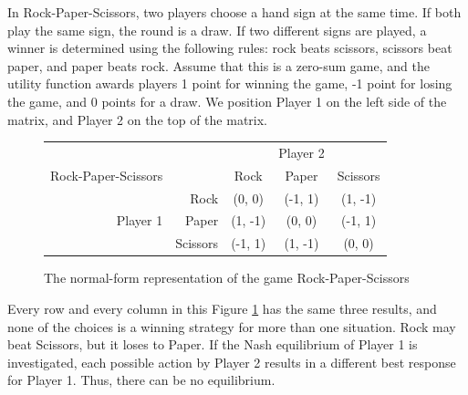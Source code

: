 \begin{exmp}
  In Rock-Paper-Scissors, two players choose a hand sign at the same time. If both play the same sign, the round is a draw. If two different signs are played, a winner is determined using the following rules: rock beats scissors, scissors beat paper, and paper beats rock. Assume that this is a zero-sum game, and the utility function awards players 1 point for winning the game, -1 point for losing the game, and 0 points for a draw. We position Player 1 on the left side of the matrix, and Player 2 on the top of the matrix.
  \begin{figure}[H]
    \centering
    \begin{tabular}{r r | c | c | c |}
      &\multicolumn{1}{c}{}&\multicolumn{1}{c}{}&\multicolumn{1}{c}{Player 2}&\multicolumn{1}{c}{}\\
      Rock-Paper-Scissors &\multicolumn{1}{c}{}&\multicolumn{1}{c}{Rock}&\multicolumn{1}{c}{Paper}&\multicolumn{1}{c}{Scissors} \\ \cline{3-5}
      & Rock & (0, 0) & (-1, 1) & (1, -1) \\ \cline{3-5}
      Player 1 & Paper & (1, -1) & (0, 0) & (-1, 1) \\ \cline{3-5}
      & Scissors & (-1, 1) & (1, -1) & (0, 0) \\ \cline{3-5}
    \end{tabular}
    \caption{The normal-form representation of the game Rock-Paper-Scissors}
    \label{fig:RPS}
  \end{figure}
\end{exmp}

Every row and every column in this Figure \ref{fig:RPS} has the same three results, and none of the choices is a winning strategy for more than one situation. Rock may beat Scissors, but it loses to Paper. If the Nash equilibrium of Player 1 is investigated, each possible action by Player 2 results in a different best response for Player 1. Thus, there can be no equilibrium.

